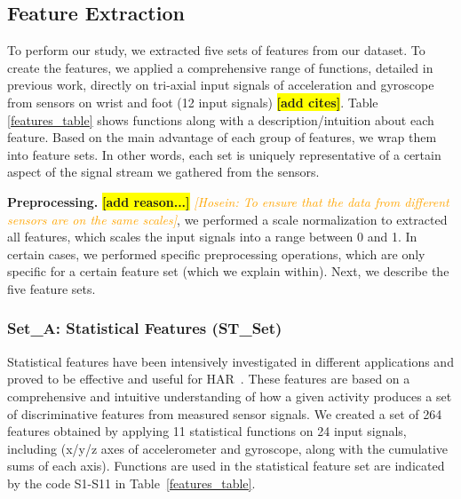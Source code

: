 \documentclass[journal,article,submit,moreauthors,pdftex]{Definitions/mdpi}
\newcommand{\hosein}[1]{\textcolor{orange}{{\it [Hosein: #1]}}}
\newcommand{\todo}[1]{\colorbox{yellow}{\textbf{[#1]}}}
\begin{document}
\subsection{Feature Extraction}

To perform our study, we extracted five sets of features from our dataset. To create the features, we applied a comprehensive range of functions, detailed in previous work, directly on tri-axial input signals of acceleration and gyroscope from sensors on wrist and foot (12 input signals) \cite{morris2014recofit, yurtman2017activity, zhang2011feature, Sarbishei2019platform} \todo{add cites}. Table \ref{features_table} shows functions along with a description/intuition about each feature. Based on the main advantage of each group of features, we wrap them into  feature sets. In other words, each set is uniquely representative of a certain aspect of the signal stream we gathered from the sensors. 

\textbf{Preprocessing.}  \todo{add reason...} \hosein{To ensure that the data from different sensors are on the same scales}, we performed a scale normalization to extracted all features, which scales the input signals into a range between 0 and 1. In certain cases, we performed specific preprocessing operations, which are only specific for a certain feature set (which we explain within). Next, we describe the five feature sets.

\subsubsection{Set\_A: Statistical Features (ST\_Set)}
Statistical features have been intensively investigated in different applications and proved to be effective and useful for HAR~\cite{rosati2018comparison}. These features are based on a comprehensive and intuitive understanding of how a given activity produces a set of discriminative features from measured sensor signals. We created a set of 264 features obtained by applying 11 statistical functions on 24 input signals, including (x/y/z axes of accelerometer and gyroscope, along with the cumulative sums of each axis). Functions are used in the statistical feature set are indicated by the code S1-S11 in Table~\ref{features_table}. 
\end{document}
